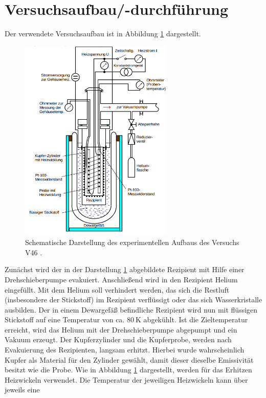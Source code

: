 \section{Versuchsaufbau/-durchführung}
Der verwendete Versuchsaufbau ist in Abbildung \ref{fig: aufbau} dargestellt.
\begin{figure}
  \centering
  \includegraphics[width = 0.65\textwidth]{./content/images/aufbau.png}
  \caption{Schematische Darstellung des experimentellen Aufbaus des Versuchs V46  \cite{anleitungV47}.}
  \label{fig: aufbau}
\end{figure}
Zunächst wird der in der Darstellung \ref{fig: aufbau} abgebildete Rezipient
mit Hilfe einer Drehschieberpumpe evakuiert. Anschließend wird in den Rezipient
Helium eingefüllt. Mit dem Helium soll verhindert werden, das sich die Restluft
(insbesondere der Stickstoff) im Rezipient verflüssigt oder das sich Wasserkristalle
ausbilden. Der in einem Dewargefäß befindliche Rezipient wird nun mit flüssigen
Stickstoff auf eine Temperatur von ca. $\SI{80}{\kelvin}$ abgekühlt. Ist die
Zieltemperatur erreicht, wird das Helium mit der Drehschieberpumpe abgepumpt und
ein Vakuum erzeugt. Der Kupferzylinder und die Kupferprobe, werden nach Evakuierung
des Rezipienten, langsam erhitzt. Hierbei wurde wahrscheinlich Kupfer als Material
für den Zylinder gewählt, damit dieser dieselbe Emissivität besitzt
wie die Probe. Wie in Abbildung \ref{fig: aufbau} dargestellt, werden für das Erhitzen
Heizwickeln verwendet. Die Temperatur der jeweiligen Heizwickeln kann über jeweils eine
